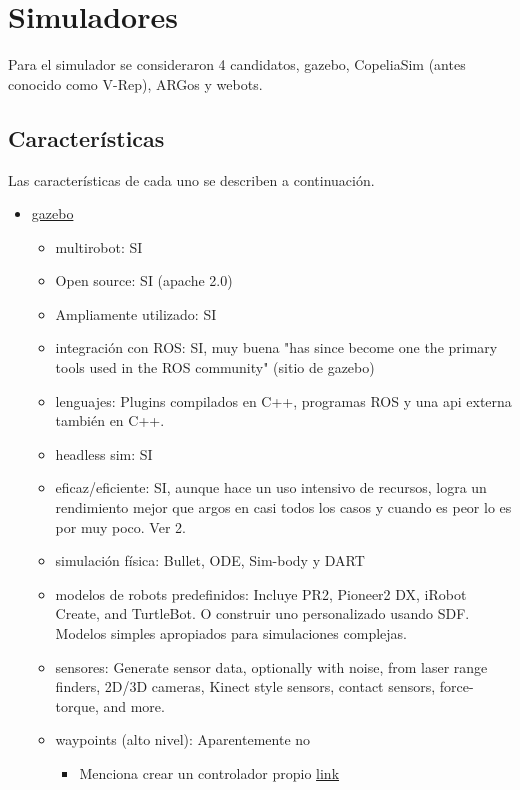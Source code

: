 \section{Simuladores}
Para el simulador se consideraron 4 candidatos, gazebo, CopeliaSim (antes conocido como V-Rep), ARGos y webots.

\subsection{Características}
Las características de cada uno se describen a continuación.
\begin{itemize}
  \item \href{http://gazebosim.org/}{gazebo}
  \begin{itemize}
    \item multirobot:                     SI
    \item Open source:                    SI (apache 2.0)
    \item Ampliamente utilizado:          SI
    \item integración con ROS:            SI, muy buena "has since become one the primary tools used in the ROS community" (sitio de gazebo)
    \item lenguajes:                      Plugins compilados en C++, programas ROS y una api externa también en C++. 
    \item headless sim:                   SI
    \item eficaz/eficiente:               SI, aunque hace un uso intensivo de recursos, logra un rendimiento mejor que argos en casi todos los casos y cuando es peor lo es por muy poco. Ver 2. 
    \item simulación física:              Bullet, ODE, Sim-body y DART  
    \item modelos de robots predefinidos: Incluye PR2, Pioneer2 DX, iRobot Create, and TurtleBot. O construir uno personalizado usando SDF. 
                                      Modelos simples apropiados para simulaciones complejas.
    \item sensores:                       Generate sensor data, optionally with noise, from laser range finders, 2D/3D cameras, Kinect
                                      style sensors, contact sensors, force-torque, and more. 
    \item waypoints (alto nivel):         Aparentemente no 
    \begin{itemize}
      \item Menciona crear un controlador propio \href{https://www.theconstructsim.com/ros-qa-053-how-to-move-a-robot-to-a-certain-point-using-twist/}{link}

\end{itemize}
\end{itemize}
\end{itemize}
